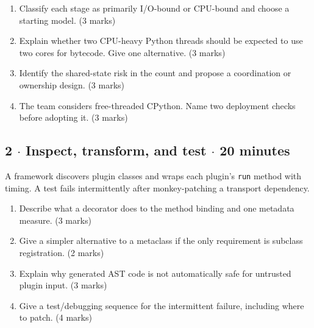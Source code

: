 \documentclass[11pt]{article}
\begin{document}
\begin{keepsection}
\begin{keepsection}
\begin{keepsection}
\begin{enumerate}
\item Classify each stage as primarily I/O-bound or CPU-bound and choose a starting model. (3 marks)
\item Explain whether two CPU-heavy Python threads should be expected to use two cores for bytecode. Give one alternative. (3 marks)
\item Identify the shared-state risk in the count and propose a coordination or ownership design. (3 marks)
\item The team considers free-threaded CPython. Name two deployment checks before adopting it. (3 marks)
\end{enumerate}

\end{keepsection}

\begin{keepsection}
\subsection{2 \ensuremath{\cdot} Inspect, transform, and test \ensuremath{\cdot} 20 minutes}

A framework discovers plugin classes and wraps each plugin’s \texttt{run} method with timing. A test fails intermittently after monkey-patching a transport dependency.

\begin{enumerate}
\item Describe what a decorator does to the method binding and one metadata measure. (3 marks)
\item Give a simpler alternative to a metaclass if the only requirement is subclass registration. (2 marks)
\item Explain why generated AST code is not automatically safe for untrusted plugin input. (3 marks)
\item Give a test/debugging sequence for the intermittent failure, including where to patch. (4 marks)
\end{enumerate}

\end{keepsection}
\end{keepsection}


\end{keepsection}
\end{document}
